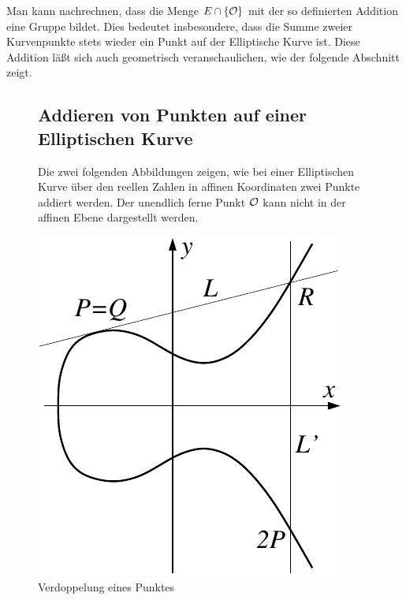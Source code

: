 \begin{refsegment}
{}

Man kann nachrechnen, dass die Menge $E\cap\{\cal O\}$ mit der so definierten
Addition eine Gruppe bildet. Dies bedeutet insbesondere, dass die Summe zweier
Kurvenpunkte stets wieder ein Punkt auf der Elliptische Kurve ist. Diese
Addition läßt sich auch geometrisch veranschaulichen, wie der folgende
Abschnitt zeigt.

\begin{figure}[htbp]
\subsection*{Addieren von Punkten auf einer Elliptischen Kurve}
Die zwei folgenden Abbildungen zeigen, wie bei einer Elliptischen Kurve über den reellen Zahlen in affinen Koordinaten
zwei Punkte addiert werden. Der unendlich ferne Punkt ${\cal O}$ kann nicht in der affinen
Ebene dargestellt werden.
\begin{center}
\includegraphics[scale=1.08]{figures/ec-mult2}
\caption{Verdoppelung eines Punktes}

\end{center}
\end{figure}
\end{refsegment}
